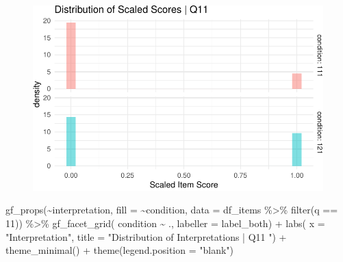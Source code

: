 \documentclass[
  letterpaper,
  DIV=11,
  numbers=noendperiod]{scrreprt}
\newenvironment{Shaded}{\begin{snugshade}}{\end{snugshade}}
\newcommand{\AttributeTok}[1]{\textcolor[rgb]{0.40,0.45,0.13}{#1}}
\newcommand{\DecValTok}[1]{\textcolor[rgb]{0.68,0.00,0.00}{#1}}
\newcommand{\FunctionTok}[1]{\textcolor[rgb]{0.28,0.35,0.67}{#1}}
\newcommand{\NormalTok}[1]{\textcolor[rgb]{0.00,0.23,0.31}{#1}}
\newcommand{\SpecialCharTok}[1]{\textcolor[rgb]{0.37,0.37,0.37}{#1}}
\newcommand{\StringTok}[1]{\textcolor[rgb]{0.13,0.47,0.30}{#1}}
\begin{document}
\begin{figure}[H]

{\centering \includegraphics{analysis/SGC3A/2_sgc3A_scoring_files/figure-pdf/Q11-distribution-1.pdf}

}

\end{figure}

\begin{Shaded}
\begin{Highlighting}[]
\FunctionTok{gf\_props}\NormalTok{(}\SpecialCharTok{\textasciitilde{}}\NormalTok{interpretation, }\AttributeTok{fill =} \SpecialCharTok{\textasciitilde{}}\NormalTok{condition, }\AttributeTok{data =}\NormalTok{ df\_items }\SpecialCharTok{\%\textgreater{}\%} \FunctionTok{filter}\NormalTok{(q }\SpecialCharTok{==} \DecValTok{11}\NormalTok{)) }\SpecialCharTok{\%\textgreater{}\%}
  \FunctionTok{gf\_facet\_grid}\NormalTok{( condition }\SpecialCharTok{\textasciitilde{}}\NormalTok{ ., }\AttributeTok{labeller =}\NormalTok{ label\_both) }\SpecialCharTok{+} 
  \FunctionTok{labs}\NormalTok{( }\AttributeTok{x =} \StringTok{"Interpretation"}\NormalTok{, }\AttributeTok{title =} \StringTok{"Distribution of Interpretations | Q11 "}\NormalTok{) }\SpecialCharTok{+} 
  \FunctionTok{theme\_minimal}\NormalTok{() }\SpecialCharTok{+} \FunctionTok{theme}\NormalTok{(}\AttributeTok{legend.position =} \StringTok{"blank"}\NormalTok{)}
\end{Highlighting}
\end{Shaded}
\end{document}

